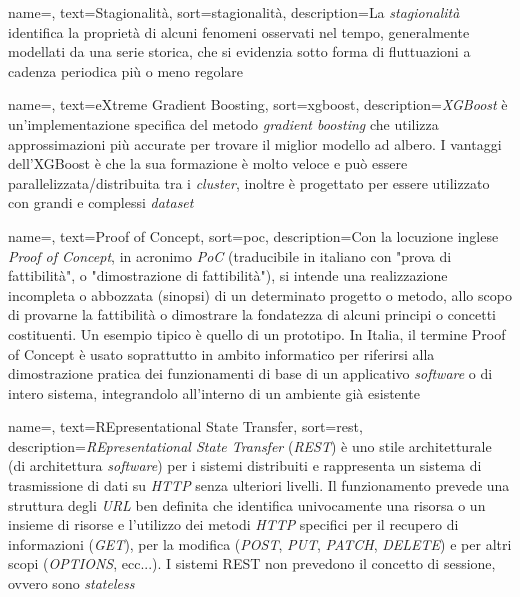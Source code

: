 {
    name=,
    text=Stagionalità,
    sort=stagionalità,
    description={La \textit{stagionalità} identifica la proprietà di alcuni fenomeni osservati nel tempo, generalmente modellati da una serie storica, che si evidenzia sotto forma di fluttuazioni a cadenza periodica più o meno regolare}
}

{
    name=,
    text=eXtreme Gradient Boosting,
    sort=xgboost,
    description={\textit{XGBoost} è un'implementazione specifica del metodo \textit{gradient boosting} che utilizza approssimazioni più accurate per trovare il miglior modello ad albero. I vantaggi dell'XGBoost è che la sua formazione è molto veloce e può essere parallelizzata/distribuita tra i \textit{\gls{cluster}}, inoltre è progettato per essere utilizzato con grandi e complessi \textit{dataset}}
}

{
    name=,
    text=Proof of Concept,
    sort=poc,
    description={Con la locuzione inglese \textit{Proof of Concept}, in acronimo \textit{PoC} (traducibile in italiano con "prova di fattibilità", o "dimostrazione di fattibilità"), si intende una realizzazione incompleta o abbozzata (sinopsi) di un determinato progetto o metodo, allo scopo di provarne la fattibilità o dimostrare la fondatezza di alcuni principi o concetti costituenti. Un esempio tipico è quello di un prototipo. In Italia, il termine Proof of Concept è usato soprattutto in ambito informatico per riferirsi alla dimostrazione pratica dei funzionamenti di base di un applicativo \textit{software} o di intero sistema, integrandolo all'interno di un ambiente già esistente}
}

{
    name=,
    text=REpresentational State Transfer,
    sort=rest,
    description={\textit{REpresentational State Transfer} (\textit{REST}) è uno stile architetturale (di architettura \textit{software}) per i sistemi distribuiti e rappresenta un sistema di trasmissione di dati su \textit{HTTP} senza ulteriori livelli. Il funzionamento prevede una struttura degli \textit{URL} ben definita che identifica univocamente una risorsa o un insieme di risorse e l'utilizzo dei metodi \textit{HTTP} specifici per il recupero di informazioni (\textit{GET}), per la modifica (\textit{POST}, \textit{PUT}, \textit{PATCH}, \textit{DELETE}) e per altri scopi (\textit{OPTIONS}, ecc...). I sistemi REST non prevedono il concetto di sessione, ovvero sono \textit{\gls{stateless}}}
}

